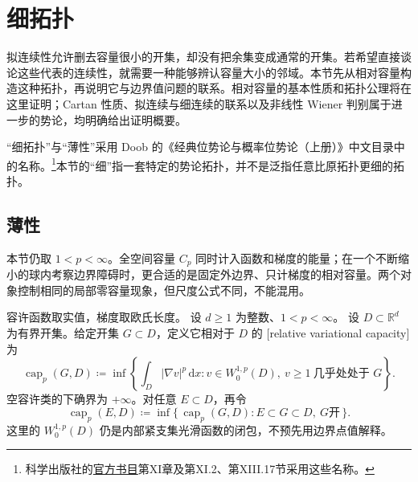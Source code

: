 \section{细拓扑}
\label{b1:sec:2604}

拟连续性允许删去容量很小的开集，却没有把余集变成通常的开集。若希望直接谈论这些代表的连续性，就需要一种能够辨认容量大小的邻域。本节先从相对容量构造这种拓扑，再说明它与边界值问题的联系。相对容量的基本性质和拓扑公理将在这里证明；Cartan 性质、拟连续与细连续的联系以及非线性 Wiener 判别属于进一步的势论，均明确给出证明概要。

\ProseParagraphBreak

“细拓扑”与“薄性”采用 Doob 的《经典位势论与概率位势论（上册）》中文目录中的名称。\footnote{科学出版社的\href{https://www.ecsponline.com/goods.php?id=6199}{官方书目}第XI章及第XI.2、第XIII.17节采用这些名称。}本节的“细”指一套特定的势论拓扑，并不是泛指任意比原拓扑更细的拓扑。


\subsection{薄性}
\label{b1:subsec:260401}

本节仍取 \(1<p<\infty\)。全空间容量 \(C_p\) 同时计入函数和梯度的能量；在一个不断缩小的球内考察边界障碍时，更合适的是固定外边界、只计梯度的相对容量。两个对象控制相同的局部零容量现象，但尺度公式不同，不能混用。

\begin{definition}\label{b1:def:relative-variational-capacity}
容许函数取实值，梯度取欧氏长度。
设 \(d\geq1\) 为整数、\(1<p<\infty\)。
设 \(D\subset\mathbb R^d\) 为有界开集。给定开集 \(G\subset D\)，定义它相对于 \(D\) 的 [relative variational capacity]为
\[
 \operatorname{cap}_p(G,D)
 \coloneqq\inf\left\{\int_D|\nabla v|^p\,\mathrm dx:
 v\in W_0^{1,p}(D),\
 v\ge1\ \text{几乎处处于 }G\right\}.
\]
空容许类的下确界为 \(+\infty\)。对任意 \(E\subset D\)，再令
\[
 \operatorname{cap}_p(E,D)
 \coloneqq\inf\{\,\operatorname{cap}_p(G,D):
 E\subset G\subset D,\ G\text{开}\,\}.
\]
这里的 \(W_0^{1,p}(D)\) 仍是内部紧支集光滑函数的闭包，不预先用边界点值解释。
\end{definition}


